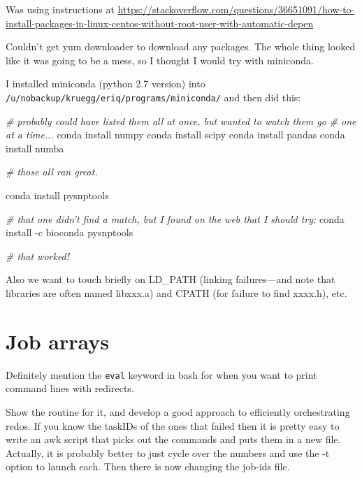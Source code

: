 \documentclass[]{krantz}
\makeatletter
\newenvironment{Shaded}{\begin{snugshade}}{\end{snugshade}}
\newcommand{\CommentTok}[1]{\textcolor[rgb]{0.37,0.37,0.37}{\textit{#1}}}
\newcommand{\ExtensionTok}[1]{#1}
\newcommand{\NormalTok}[1]{#1}
\newenvironment{kframe}{%
\medskip{}
\setlength{\fboxsep}{.8em}
 \def\at@end@of@kframe{}%
 \ifinner\ifhmode%
  \def\at@end@of@kframe{\end{minipage}}%
  \begin{minipage}{\columnwidth}%
 \fi\fi%
 \def\FrameCommand##1{\hskip\@totalleftmargin \hskip-\fboxsep
 \colorbox{shadecolor}{##1}\hskip-\fboxsep
     \hskip-\linewidth \hskip-\@totalleftmargin \hskip\columnwidth}%
 \MakeFramed {\advance\hsize-\width
   \@totalleftmargin\z@ \linewidth\hsize
   \@setminipage}}%
 {\par\unskip\endMakeFramed%
 \at@end@of@kframe}
\renewenvironment{Shaded}{\begin{kframe}}{\end{kframe}}
\makeatother
\begin{document}
Was using instructions at \url{https://stackoverflow.com/questions/36651091/how-to-install-packages-in-linux-centos-without-root-user-with-automatic-depen}

Couldn't get yum downloader to download any packages. The whole thing looked like it was going to
be a mess, so I thought I would try with miniconda.

I installed miniconda (python 2.7 version) into \texttt{/u/nobackup/kruegg/eriq/programs/miniconda/} and then did this:

\begin{Shaded}
\begin{Highlighting}[]
\CommentTok{# probably could have listed them all at once, but wanted to watch them go }
\CommentTok{# one at a time...}
\ExtensionTok{conda}\NormalTok{ install numpy}
\ExtensionTok{conda}\NormalTok{ install scipy}
\ExtensionTok{conda}\NormalTok{ install pandas}
\ExtensionTok{conda}\NormalTok{ install numba}

\CommentTok{# those all ran great.}

\ExtensionTok{conda}\NormalTok{ install pysnptools}

\CommentTok{# that one didn't find a match, but I found on the web that I should try:}
\ExtensionTok{conda}\NormalTok{ install -c bioconda pysnptools }

\CommentTok{# that worked!}
\end{Highlighting}
\end{Shaded}

Also we want to touch briefly on LD\_PATH (linking failures---and note that libraries are often
named libxxx.a) and CPATH (for failure to find xxxx.h), etc.

\hypertarget{job-arrays}{%
\section{Job arrays}\label{job-arrays}}

Definitely mention the \texttt{eval} keyword in bash for when you want to print
command lines with redirects.

Show the routine for it, and develop a good approach to efficiently
orchestrating redos. If you know the taskIDs of the ones that failed
then it is pretty easy to write an awk script that picks out the
commands and puts them in a new file. Actually, it is probably
better to just cycle over the numbers and use the -t option
to launch each. Then there is now changing the job-ids file.
\end{document}

